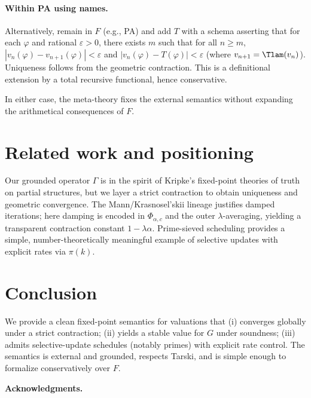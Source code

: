 \documentclass[12]{amsart}
\theoremstyle{plain}
\begin{document}
\paragraph{Within PA using names.}
Alternatively, remain in $F$ (e.g., PA) and add $T$ with a schema asserting that for each $\varphi$ and rational $\varepsilon>0$, there exists $m$ such that for all $n\ge m$, $|v_n(\varphi)-v_{n+1}(\varphi)|<\varepsilon$ and $|v_n(\varphi)-T(\varphi)|<\varepsilon$ (where $v_{n+1}=\Tlam(v_n)$). Uniqueness follows from the geometric contraction. This is a definitional extension by a total recursive functional, hence conservative.

\begin{remark}
In either case, the meta-theory fixes the external semantics without expanding the arithmetical consequences of $F$.
\end{remark}

\section{Related work and positioning}

Our grounded operator $\Gamma$ is in the spirit of Kripke's fixed-point theories of truth on partial structures, but we layer a strict contraction to obtain uniqueness and geometric convergence. The Mann/Krasnosel'skii lineage justifies damped iterations; here damping is encoded in $\Phi_{\alpha,c}$ and the outer $\lambda$-averaging, yielding a transparent contraction constant $1-\lambda\alpha$. Prime-sieved scheduling provides a simple, number-theoretically meaningful example of selective updates with explicit rates via $\pi(k)$.

\section{Conclusion}

We provide a clean fixed-point semantics for valuations that (i) converges globally under a strict contraction; (ii) yields a stable value for $G$ under soundness; (iii) admits selective-update schedules (notably primes) with explicit rate control. The semantics is external and grounded, respects Tarski, and is simple enough to formalize conservatively over $F$.

\bigskip
\noindent\textbf{Acknowledgments.} %

\appendix
\end{document}

